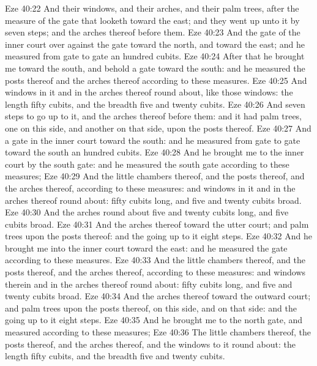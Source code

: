\vs Eze 40:22 And their windows, and their arches, and their palm trees,  after the measure of the gate that looketh toward the east; and they went up unto it by seven steps; and the arches thereof  before them.
\vs Eze 40:23 And the gate of the inner court  over against the gate toward the north, and toward the east; and he measured from gate to gate an hundred cubits.
\vs Eze 40:24 After that he brought me toward the south, and behold a gate toward the south: and he measured the posts thereof and the arches thereof according to these measures.
\vs Eze 40:25 And  windows in it and in the arches thereof round about, like those windows: the length  fifty cubits, and the breadth five and twenty cubits.
\vs Eze 40:26 And  seven steps to go up to it, and the arches thereof  before them: and it had palm trees, one on this side, and another on that side, upon the posts thereof.
\vs Eze 40:27 And  a gate in the inner court toward the south: and he measured from gate to gate toward the south an hundred cubits.
\vs Eze 40:28 And he brought me to the inner court by the south gate: and he measured the south gate according to these measures;
\vs Eze 40:29 And the little chambers thereof, and the posts thereof, and the arches thereof, according to these measures: and  windows in it and in the arches thereof round about:  fifty cubits long, and five and twenty cubits broad.
\vs Eze 40:30 And the arches round about  five and twenty cubits long, and five cubits broad.
\vs Eze 40:31 And the arches thereof  toward the utter court; and palm trees  upon the posts thereof: and the going up to it  eight steps.
\vs Eze 40:32 And he brought me into the inner court toward the east: and he measured the gate according to these measures.
\vs Eze 40:33 And the little chambers thereof, and the posts thereof, and the arches thereof,  according to these measures: and  windows therein and in the arches thereof round about:  fifty cubits long, and five and twenty cubits broad.
\vs Eze 40:34 And the arches thereof  toward the outward court; and palm trees  upon the posts thereof, on this side, and on that side: and the going up to it  eight steps.
\vs Eze 40:35 And he brought me to the north gate, and measured  according to these measures;
\vs Eze 40:36 The little chambers thereof, the posts thereof, and the arches thereof, and the windows to it round about: the length  fifty cubits, and the breadth five and twenty cubits.
